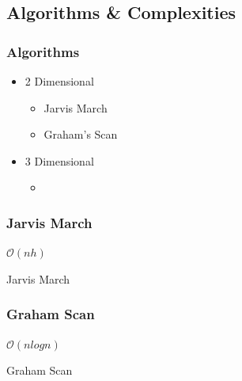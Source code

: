 \documentclass{beamer}
\begin{document}
    \subsection{Algorithms \& Complexities}
    \begin{frame}
      \frametitle{Algorithms}
      \begin{itemize}
        \item 2 Dimensional
        \begin{itemize}
          \item Jarvis March
          \item Graham's Scan
        \end{itemize}
        \item 3 Dimensional 
        \begin{itemize}
          \item 
        \end{itemize}
      \end{itemize}
    \end{frame}
    
    \begin{frame}
      \frametitle{Jarvis March}
      
    \begin{center}
      $\mathcal{O}(nh)$
    \end{center}
  \end{frame}
  
  \begin{frame}{Jarvis March}
  \end{frame}
  
  
  \begin{frame}
    \frametitle{Graham Scan}
    
    \begin{center}
      
      $\mathcal{O}(n log n)$
    \end{center}
  \end{frame}
  
  \begin{frame}{Graham Scan}
    \end{frame}
    
\end{document}
